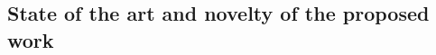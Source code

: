 \documentclass[a4paper,11pt]{article}
\begin{document}
\subsection{State of the art and novelty of the proposed work}

\end{document}
